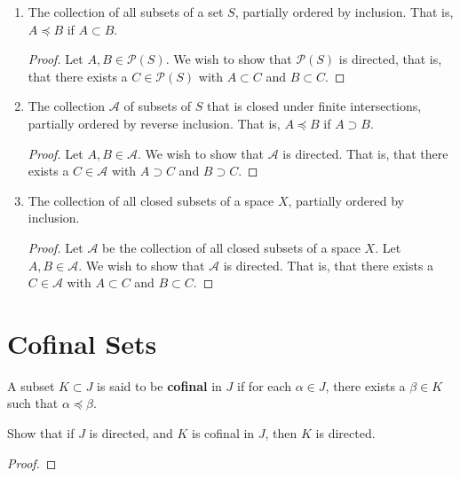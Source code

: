 \documentclass[12pt]{article}
\begin{document}
\begin{enumerate}
    \item The collection of all subsets of a set $S$, partially ordered by inclusion. That is, $A \preceq B$ if $A \subset B$.
          \begin{proof}
            Let $A, B \in \mathcal P(S)$. We wish to show that $\mathcal P(S)$ is directed, that is, that there exists a $C \in \mathcal P(S)$ with $A \subset C$ and $B \subset C$.
          \end{proof}

    \item The collection $\mathcal A$ of subsets of $S$ that is closed under finite intersections, partially ordered by reverse inclusion. That is, $A \preceq B$ if $A \supset B$.
          \begin{proof}
            Let $A, B \in \mathcal A$. We wish to show that $\mathcal A$ is directed. That is, that there exists a $C \in \mathcal A$ with $A \supset C$ and $B \supset C$.
          \end{proof}

    \item The collection of all closed subsets of a space $X$, partially ordered by inclusion.
          \begin{proof}
            Let $\mathcal A$ be the collection of all closed subsets of a space $X$. Let $A, B \in \mathcal A$. We wish to show that $\mathcal A$ is directed. That is, that there exists a $C \in \mathcal A$ with $A \subset C$ and $B \subset C$.
          \end{proof}
\end{enumerate}

\section{Cofinal Sets}
\begin{defn}
    A subset $K \subset J$ is said to be \textbf{cofinal} in $J$ if for each $\alpha \in J$, there exists a $\beta \in K$ such that $\alpha \preceq \beta$.
\end{defn}

Show that if $J$ is directed, and $K$ is cofinal in $J$, then $K$ is directed.

\begin{proof}
\end{proof}
\end{document}
